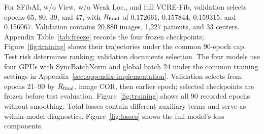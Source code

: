 For SFibAI, w/o View, w/o Weak Loc., and full VCRE-Fib, validation selects epochs 65, 80, 39, and 47, with $R_{\mathrm{final}}$ of 0.172661, 0.157844, 0.159315, and 0.156067. Validation contains 20,880 images, 1,227 patients, and 33 centers. Appendix Table~\ref{tab:freeze} records the four frozen checkpoints; Figure~\ref{fig:training} shows their trajectories under the common 90-epoch cap. Test risk determines ranking; validation documents selection.
The four models use four GPUs with SyncBatchNorm and global batch 24 under the common training settings in Appendix~\ref{sec:appendix-implementation}. Validation selects from epochs 21--90 by $R_{\mathrm{final}}$, image COR, then earlier epoch; selected checkpoints are frozen before test evaluation. Figure~\ref{fig:training} shows all 90 recorded epochs without smoothing. Total losses contain different auxiliary terms and serve as within-model diagnostics. Figure~\ref{fig:losses} shows the full model's loss components.

\FloatBarrier

